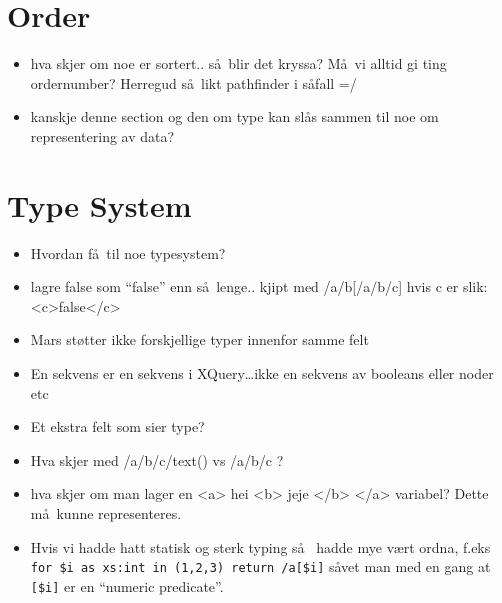 



\section{Order}
\label{sect:discussion:order}
\begin{itemize}
  \item hva skjer om noe er sortert.. s\aa~blir det kryssa? M\aa~vi alltid gi ting ordernumber? Herregud s\aa~likt
  pathfinder i s\aa fall =/
  \item kanskje denne section og den om type kan sl\aa s sammen til noe om representering av data?
\end{itemize}

\section{Type System}
\label{sect:discussion:typeSystem}
\begin{itemize}
  \item Hvordan f\aa~til noe typesystem?
  \item lagre false som ``false'' enn s\aa~lenge.. kjipt med /a/b[/a/b/c] hvis c er slik: <c>false</c>
  \item Mars st\o tter ikke forskjellige typer innenfor samme felt
  \item En sekvens er en sekvens i XQuery\ldots ikke en sekvens av booleans
  eller noder etc
  \item Et ekstra felt som sier type?
  \item Hva skjer med /a/b/c/text() vs /a/b/c ?
  \item hva skjer om man lager en <a> hei <b> jeje </b> </a> variabel? Dette
  m\aa~kunne representeres.
  \item Hvis vi hadde hatt statisk og sterk typing s\aa~ hadde mye v\ae rt
  ordna, f.eks \verb!for $i as xs:int in (1,2,3) return /a[$i]! s\aa vet man
  med en gang at \verb![$i]! er en ``numeric predicate''.
\end{itemize}

